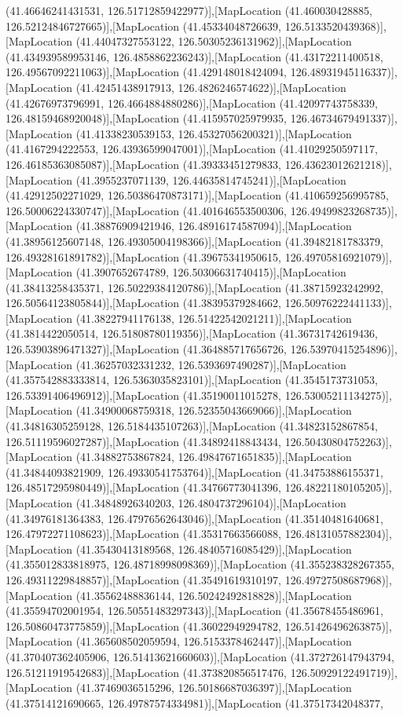 (41.46646241431531, 126.51712859422977)],[MapLocation (41.460030428885, 126.52124846727665)],[MapLocation (41.45334048726639, 126.5133520439368)],[MapLocation (41.44047327553122, 126.50305236131962)],[MapLocation (41.434939589953146, 126.4858862236243)],[MapLocation (41.43172211400518, 126.49567092211063)],[MapLocation (41.429148018424094, 126.48931945116337)],[MapLocation (41.42451438917913, 126.4826246574622)],[MapLocation (41.42676973796991, 126.4664884880286)],[MapLocation (41.42097743758339, 126.48159468920048)],[MapLocation (41.415957025979935, 126.46734679491337)],[MapLocation (41.41338230539153, 126.45327056200321)],[MapLocation (41.4167294222553, 126.43936599047001)],[MapLocation (41.41029250597117, 126.46185363085087)],[MapLocation (41.39333451279833, 126.43623012621218)],[MapLocation (41.3955237071139, 126.44635814745241)],[MapLocation (41.42912502271029, 126.50386470873171)],[MapLocation (41.410659256995785, 126.50006224330747)],[MapLocation (41.401646553500306, 126.49499823268735)],[MapLocation (41.38876909421946, 126.48916174587094)],[MapLocation (41.38956125607148, 126.49305004198366)],[MapLocation (41.39482181783379, 126.49328161891782)],[MapLocation (41.39675341950615, 126.49705816921079)],[MapLocation (41.3907652674789, 126.50306631740415)],[MapLocation (41.38413258435371, 126.50229384120786)],[MapLocation (41.38715923242992, 126.50564123805844)],[MapLocation (41.38395379284662, 126.50976222441133)],[MapLocation (41.38227941176138, 126.51422542021211)],[MapLocation (41.3814422050514, 126.51808780119356)],[MapLocation (41.36731742619436, 126.53903896471327)],[MapLocation (41.364885717656726, 126.53970415254896)],[MapLocation (41.36257032331232, 126.5393697490287)],[MapLocation (41.357542883333814, 126.5363035823101)],[MapLocation (41.3545173731053, 126.53391406496912)],[MapLocation (41.35190011015278, 126.53005211134275)],[MapLocation (41.34900068759318, 126.52355043669066)],[MapLocation (41.34816305259128, 126.5184435107263)],[MapLocation (41.34823152867854, 126.51119596027287)],[MapLocation (41.34892418843434, 126.50430804752263)],[MapLocation (41.34882753867824, 126.49847671651835)],[MapLocation (41.34844093821909, 126.49330541753764)],[MapLocation (41.34753886155371, 126.48517295980449)],[MapLocation (41.34766773041396, 126.48221180105205)],[MapLocation (41.34848926340203, 126.4804737296104)],[MapLocation (41.34976181364383, 126.47976562643046)],[MapLocation (41.35140481640681, 126.47972271108623)],[MapLocation (41.35317663566088, 126.48131057882304)],[MapLocation (41.35430413189568, 126.48405716085429)],[MapLocation (41.355012833818975, 126.48718998098369)],[MapLocation (41.355238328267355, 126.49311229848857)],[MapLocation (41.35491619310197, 126.49727508687968)],[MapLocation (41.35562488836144, 126.50242492818828)],[MapLocation (41.35594702001954, 126.50551483297343)],[MapLocation (41.35678455486961, 126.50860473775859)],[MapLocation (41.36022949294782, 126.51426496263875)],[MapLocation (41.365608502059594, 126.5153378462447)],[MapLocation (41.370407362405906, 126.51413621660603)],[MapLocation (41.372726147943794, 126.51211919542683)],[MapLocation (41.373820856517476, 126.50929122491719)],[MapLocation (41.37469036515296, 126.50186687036397)],[MapLocation (41.37514121690665, 126.49787574334981)],[MapLocation (41.37517342048377, 